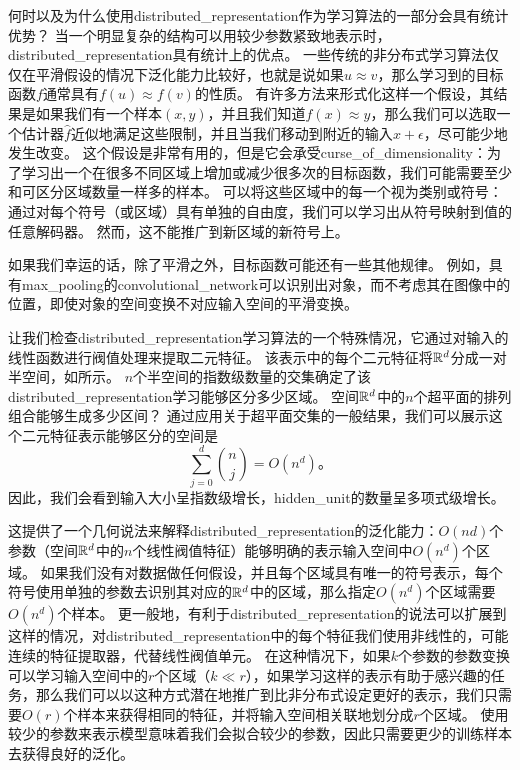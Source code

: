 何时以及为什么使用\gls{distributed_representation}作为学习算法的一部分会具有统计优势？
当一个明显复杂的结构可以用较少参数紧致地表示时，\gls{distributed_representation}具有统计上的优点。
一些传统的非分布式学习算法仅仅在平滑假设的情况下泛化能力比较好，也就是说如果$u\approx v$，那么学习到的目标函数$f$通常具有$f(u) \approx f(v)$的性质。
有许多方法来形式化这样一个假设，其结果是如果我们有一个样本$(x,y)$，并且我们知道$f(x) \approx y$，那么我们可以选取一个估计器$\hat{f}$近似地满足这些限制，并且当我们移动到附近的输入$x + \epsilon$，尽可能少地发生改变。
这个假设是非常有用的，但是它会承受\gls{curse_of_dimensionality}：为了学习出一个在很多不同区域上增加或减少很多次的目标函数，我们可能需要至少和可区分区域数量一样多的样本。
可以将这些区域中的每一个视为类别或符号：通过对每个符号（或区域）具有单独的自由度，我们可以学习出从符号映射到值的任意解码器。
然而，这不能推广到新区域的新符号上。


如果我们幸运的话，除了平滑之外，目标函数可能还有一些其他规律。
例如，具有\gls{max_pooling}的\gls{convolutional_network}可以识别出对象，而不考虑其在图像中的位置，即使对象的空间变换不对应输入空间的平滑变换。


让我们检查\gls{distributed_representation}学习算法的一个特殊情况，它通过对输入的线性函数进行阀值处理来提取二元特征。
该表示中的每个二元特征将$\mathbb{R}^d$分成一对半空间，如所示。
$n$个半空间的指数级数量的交集确定了该\gls{distributed_representation}学习能够区分多少区域。
空间$\mathbb{R}^d$中的$n$个超平面的排列组合能够生成多少区间？
通过应用关于超平面交集的一般结果\citep{Zaslavsky-1975}，我们可以展示\citep{Pascanu+et+al-ICLR2014b}这个二元特征表示能够区分的空间是
\begin{equation}
	\sum_{j=0}^d \binom{n}{j} = O(n^d)。
\end{equation}
因此，我们会看到输入大小呈指数级增长，\gls{hidden_unit}的数量呈多项式级增长。


这提供了一个几何说法来解释\gls{distributed_representation}的泛化能力：$O(nd)$个参数（空间$\mathbb{R}^d$中的$n$个线性阀值特征）能够明确的表示输入空间中$O(n^d)$个区域。
如果我们没有对数据做任何假设，并且每个区域具有唯一的符号表示，每个符号使用单独的参数去识别其对应的$\mathbb{R}^d$中的区域，那么指定$O(n^d)$个区域需要$O(n^d)$个样本。
更一般地，有利于\gls{distributed_representation}的说法可以扩展到这样的情况，对\gls{distributed_representation}中的每个特征我们使用非线性的，可能连续的特征提取器，代替线性阀值单元。
在这种情况下，如果$k$个参数的参数变换可以学习输入空间中的$r$个区域（$k\ll r$），如果学习这样的表示有助于感兴趣的任务，那么我们可以以这种方式潜在地推广到比非分布式设定更好的表示，我们只需要$O(r)$个样本来获得相同的特征，并将输入空间相关联地划分成$r$个区域。
使用较少的参数来表示模型意味着我们会拟合较少的参数，因此只需要更少的训练样本去获得良好的泛化。


